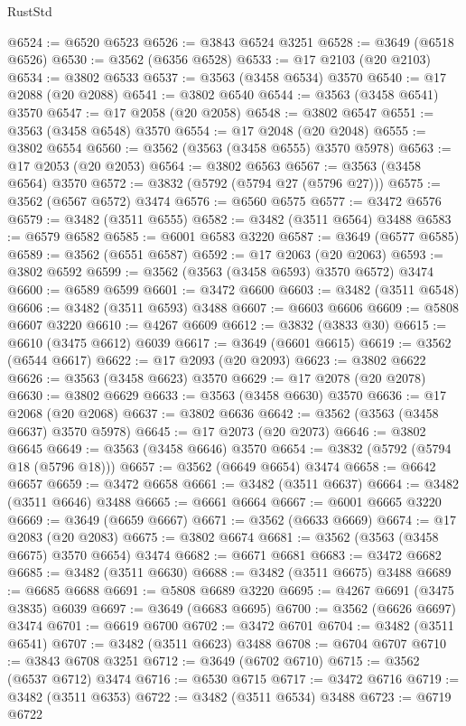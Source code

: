 \begin{lexlean}{RustStd}
\begin{coremodule}
{\begin{coremodule}
{{{{{{{{{{{{{{{{{{{{{{{{{{{{{{{{{{{{{{{{{{{{{@6524 := @6520 @6523
@6526 := @3843 @6524 @3251
@6528 := @3649 (@6518 @6526)
@6530 := @3562 (@6356 @6528)
@6533 := @17 @2103 (@20 @2103)
@6534 := @3802 @6533
@6537 := @3563 (@3458 @6534) @3570
@6540 := @17 @2088 (@20 @2088)
@6541 := @3802 @6540
@6544 := @3563 (@3458 @6541) @3570
@6547 := @17 @2058 (@20 @2058)
@6548 := @3802 @6547
@6551 := @3563 (@3458 @6548) @3570
@6554 := @17 @2048 (@20 @2048)
@6555 := @3802 @6554
@6560 := @3562 (@3563 (@3458 @6555) @3570 @5978)
@6563 := @17 @2053 (@20 @2053)
@6564 := @3802 @6563
@6567 := @3563 (@3458 @6564) @3570
@6572 := @3832 (@5792 (@5794 @27 (@5796 @27)))
@6575 := @3562 (@6567 @6572) @3474
@6576 := @6560 @6575
@6577 := @3472 @6576
@6579 := @3482 (@3511 @6555)
@6582 := @3482 (@3511 @6564) @3488
@6583 := @6579 @6582
@6585 := @6001 @6583 @3220
@6587 := @3649 (@6577 @6585)
@6589 := @3562 (@6551 @6587)
@6592 := @17 @2063 (@20 @2063)
@6593 := @3802 @6592
@6599 := @3562 (@3563 (@3458 @6593) @3570 @6572) @3474
@6600 := @6589 @6599
@6601 := @3472 @6600
@6603 := @3482 (@3511 @6548)
@6606 := @3482 (@3511 @6593) @3488
@6607 := @6603 @6606
@6609 := @5808 @6607 @3220
@6610 := @4267 @6609
@6612 := @3832 (@3833 @30)
@6615 := @6610 (@3475 @6612) @6039
@6617 := @3649 (@6601 @6615)
@6619 := @3562 (@6544 @6617)
@6622 := @17 @2093 (@20 @2093)
@6623 := @3802 @6622
@6626 := @3563 (@3458 @6623) @3570
@6629 := @17 @2078 (@20 @2078)
@6630 := @3802 @6629
@6633 := @3563 (@3458 @6630) @3570
@6636 := @17 @2068 (@20 @2068)
@6637 := @3802 @6636
@6642 := @3562 (@3563 (@3458 @6637) @3570 @5978)
@6645 := @17 @2073 (@20 @2073)
@6646 := @3802 @6645
@6649 := @3563 (@3458 @6646) @3570
@6654 := @3832 (@5792 (@5794 @18 (@5796 @18)))
@6657 := @3562 (@6649 @6654) @3474
@6658 := @6642 @6657
@6659 := @3472 @6658
@6661 := @3482 (@3511 @6637)
@6664 := @3482 (@3511 @6646) @3488
@6665 := @6661 @6664
@6667 := @6001 @6665 @3220
@6669 := @3649 (@6659 @6667)
@6671 := @3562 (@6633 @6669)
@6674 := @17 @2083 (@20 @2083)
@6675 := @3802 @6674
@6681 := @3562 (@3563 (@3458 @6675) @3570 @6654) @3474
@6682 := @6671 @6681
@6683 := @3472 @6682
@6685 := @3482 (@3511 @6630)
@6688 := @3482 (@3511 @6675) @3488
@6689 := @6685 @6688
@6691 := @5808 @6689 @3220
@6695 := @4267 @6691 (@3475 @3835) @6039
@6697 := @3649 (@6683 @6695)
@6700 := @3562 (@6626 @6697) @3474
@6701 := @6619 @6700
@6702 := @3472 @6701
@6704 := @3482 (@3511 @6541)
@6707 := @3482 (@3511 @6623) @3488
@6708 := @6704 @6707
@6710 := @3843 @6708 @3251
@6712 := @3649 (@6702 @6710)
@6715 := @3562 (@6537 @6712) @3474
@6716 := @6530 @6715
@6717 := @3472 @6716
@6719 := @3482 (@3511 @6353)
@6722 := @3482 (@3511 @6534) @3488
@6723 := @6719 @6722
}}}}}}}}}}}}}}}}}}}}}}}}}}}}}}}}}}}}}}}}}}}}}
\end{coremodule}}
\end{coremodule}
\end{lexlean}
